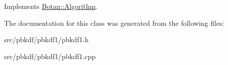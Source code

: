 Implements \hyperlink{classBotan_1_1Algorithm_a42d3ee39e051eba01ecace201fe1e6fd}{Botan\-::\-Algorithm}.



The documentation for this class was generated from the following files\-:\begin{DoxyCompactItemize}
\item 
src/pbkdf/pbkdf1/pbkdf1.\-h\item 
src/pbkdf/pbkdf1/pbkdf1.\-cpp\end{DoxyCompactItemize}
